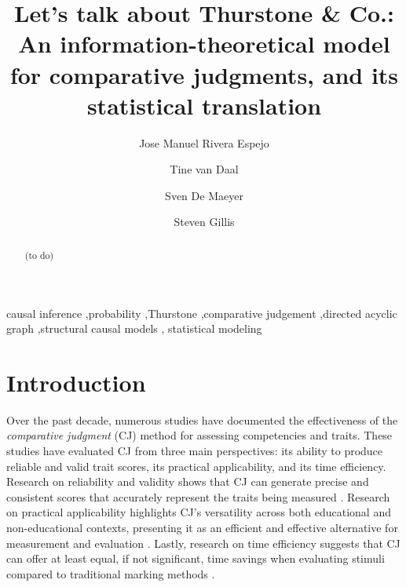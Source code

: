\documentclass[
  authoryear,
  preprint,
  1p]{elsarticle}
\begin{document}
\begin{frontmatter}
\title{Let's talk about Thurstone \& Co.: An information-theoretical
model for comparative judgments, and its statistical translation}
\author[1]{Jose Manuel Rivera Espejo%
%
}
\author[1]{Tine van Daal%
%
}
\author[1]{Sven De Maeyer%
%
}
\author[2]{Steven Gillis%
%
}






        
\begin{abstract}
(to do)
\end{abstract}





\begin{keyword}
    causal inference \sep probability \sep Thurstone \sep comparative
judgement \sep directed acyclic graph \sep structural causal
models \sep 
    statistical modeling
\end{keyword}
\end{frontmatter}
    

\section{Introduction}\label{sec-introduction}

Over the past decade, numerous studies have documented the effectiveness
of the \emph{comparative judgment} (CJ) method \citep{Thurstone_1927}
for assessing competencies and traits. These studies have evaluated CJ
from three main perspectives: its ability to produce reliable and valid
trait scores, its practical applicability, and its time efficiency.
Research on reliability and validity shows that CJ can generate precise
and consistent scores
\citep{Pollitt_2012a, Pollitt_2012b, Coertjens_et_al_2017, Goossens_et_al_2018, Verhavert_et_al_2019, Crompvoets_et_al_2022, Bouwer_et_al_2023}
that accurately represent the traits being measured
\citep{Whitehouse_2012, vanDaal_et_al_2016, Lesterhuis_2018, Bouwer_et_al_2023}.
Research on practical applicability highlights CJ's versatility across
both educational and non-educational contexts, presenting it as an
efficient and effective alternative for measurement and evaluation
\citep{Pollitt_2004, Jones_2015, Bartholomew_et_al_2018, Jones_et_al_2019, Marshall_et_al_2020, Bartholomew_et_al_2020, Boonen_et_al_2020}.
Lastly, research on time efficiency suggests that CJ can offer at least
equal, if not significant, time savings when evaluating stimuli compared
to traditional marking methods
\citep{Pollitt_2012a, Pollitt_2012b, Coertjens_et_al_2017, Goossens_et_al_2018}.
\end{document}
